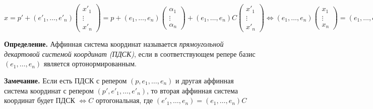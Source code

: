 $x = p' + (e'_1, \dots, e'_n) \begin{pmatrix} x'_1 \\ \vdots \\ x'_n \end{pmatrix} = p + (e_1, \dots, e_n) \begin{pmatrix} \alpha_1 \\ \vdots \\ \alpha_n \end{pmatrix} + (e_1, \dots, e_n) C \begin{pmatrix} x'_1 \\ \vdots \\ x'_n \end{pmatrix} \Leftrightarrow (e_1, \dots, e_n) \begin{pmatrix} x_1 \\ \vdots \\ x_n \end{pmatrix} = (e_1, \dots, e_n) \left(C \begin{pmatrix} x'_1 \\ \vdots \\ x'_n \end{pmatrix} + \begin{pmatrix} \alpha_1 \\ \vdots \\ \alpha_n \end{pmatrix}\right) \Rightarrow \begin{pmatrix} x_1 \\ \vdots \\ x_n \end{pmatrix} = C \begin{pmatrix} x'_1 \\ \vdots \\ x'_n \end{pmatrix} + \begin{pmatrix} \alpha_1 \\ \vdots \\ \alpha_n \end{pmatrix} \ \lhd$

\vspace{\baselineskip}
\textbf{Определение.} Аффинная система координат называется \textit{прямоугольной декартовой системой координат (ПДСК)}, если в соответствующем репере базис $(e_1, \dots, e_n)$ является ортонормированным.

\vspace{\baselineskip}
\textbf{Замечание.} Если есть ПДСК с репером $(p, e_1, \dots, e_n)$ и другая аффинная система координат с репером $(p', e'_1, \dots, e'_n)$, то вторая аффинная система координат будет ПДСК $\Leftrightarrow C$ ортогональная, где $(e'_1, \dots, e_n) = (e_1, \dots, e_n) C$

